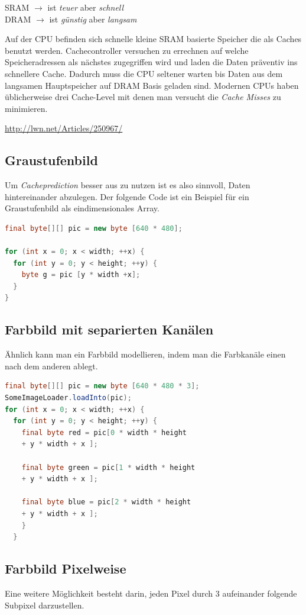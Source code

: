 \documentclass[tog]{acmsiggraph}
\begin{document}
SRAM $\rightarrow$ ist \textit{teuer} aber \textit{schnell} \\
DRAM $\rightarrow$ ist \textit{günstig} aber \textit{langsam}

Auf der CPU befinden sich schnelle kleine SRAM basierte Speicher die als Caches benutzt werden. Cachecontroller versuchen zu errechnen auf welche Speicheradressen als nächstes zugegriffen wird und laden die Daten präventiv ins schnellere Cache. Dadurch muss die CPU seltener warten bis Daten aus dem langsamen Hauptspeicher auf DRAM Basis geladen sind.
Modernen CPUs haben üblicherweise drei Cache-Level mit denen man versucht die \textit{Cache Misses} zu minimieren.

{\small\url{http://lwn.net/Articles/250967/}}

\subsection{Graustufenbild}
Um \textit{Cacheprediction} besser aus zu nutzen ist es also sinnvoll, Daten hintereinander abzulegen. Der folgende Code ist ein Beispiel für ein Graustufenbild als eindimensionales Array.

\begin{lstlisting}[language=Java]
final byte[][] pic = new byte [640 * 480];

for (int x = 0; x < width; ++x) {
  for (int y = 0; y < height; ++y) {
    byte g = pic [y * width +x];
  }
}
\end{lstlisting}

\subsection{Farbbild mit separierten Kanälen}
Ähnlich kann man ein Farbbild modellieren, indem man die Farbkanäle einen nach dem anderen ablegt.

\begin{lstlisting}[language=Java]
final byte[][] pic = new byte [640 * 480 * 3];
SomeImageLoader.loadInto(pic);
for (int x = 0; x < width; ++x) {
  for (int y = 0; y < height; ++y) {
    final byte red = pic[0 * width * height
    + y * width + x ];
    
    final byte green = pic[1 * width * height 
    + y * width + x ];

    final byte blue = pic[2 * width * height
    + y * width + x ];
    }
  }
\end{lstlisting}

\subsection{Farbbild Pixelweise}
Eine weitere Möglichkeit besteht darin, jeden Pixel durch 3 aufeinander folgende Subpixel darzustellen.
\end{document}
